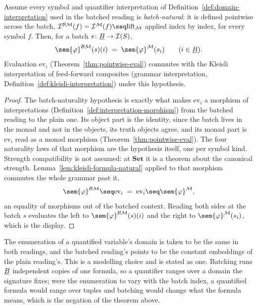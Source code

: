 \begin{theorem}
\label{thm:pointwise-eval-kleisli}
Assume every symbol and quantifier interpretation of
Definition~\ref{def:domain-interpretation} used in the batched reading
is \emph{batch-natural}: it is defined pointwise across the batch,
$\mathcal I^{\Bmon\mathcal M}(f) = \mathcal I^{\mathcal M}(f) \seq
\mathrm{lift}_{\mathcal M}$ applied index by index, for every symbol
$f$. Then, for a batch $s \colon \underline B \to \mathcal I(S)$,
\[
  \sem{\varphi}^{\Bmon\mathcal M}(s)(i) \;=\; \sem{\varphi}^{\mathcal M}(s_i)
  \qquad (i \in \Bidx).
\]
Evaluation $\mathrm{ev}_i$ (Theorem~\ref{thm:pointwise-eval}) commutes
with the Kleisli interpretation of feed-forward composites (grammar
interpretation, Definition~\ref{def:kleisli-interpretation}) under
this hypothesis.
\leanok
\end{theorem}

\begin{proof}
\leanok
The batch-naturality hypothesis is exactly what makes $\mathrm{ev}_i$ a
morphism of interpretations (Definition~\ref{def:interpretation-morphism})
from the batched reading to the plain one. Its object part is the identity, since the batch lives in
the monad and not in the objects, its truth objects agree, and its monad
part is $\mathrm{ev}_i$ read as a monad morphism
(Theorem~\ref{thm:pointwise-eval}). The four naturality laws of that
morphism are the hypothesis itself, one per symbol kind. Strength
compatibility is not assumed: at $\mathbf{Set}$ it is a theorem about the
canonical strength. Lemma~\ref{lem:kleisli-formula-natural} applied to
that morphism commutes the whole grammar past it,
\[
  \sem{\varphi}^{\Bmon\mathcal M} \seq \mathrm{ev}_i
    \;=\; \mathrm{ev}_i \seq \sem{\varphi}^{\mathcal M},
\]
an equality of morphisms out of the batched context. Reading both sides
at the batch $s$ evaluates the left to
$\sem{\varphi}^{\Bmon\mathcal M}(s)(i)$ and the right to
$\sem{\varphi}^{\mathcal M}(s_i)$, which is the display.
\end{proof}

The enumeration of a quantified variable's domain is taken to be the same
in both readings, and the batched reading's points to be the constant
embeddings of the plain reading's. This is a modelling choice and is
stated as one. Batching runs $\underline B$ independent copies of one formula, so
a quantifier ranges over a domain the signature fixes; were the
enumeration to vary with the batch index, a quantified formula would range
over tuples and batching would change what the formula means, which is the
negation of the theorem above.

